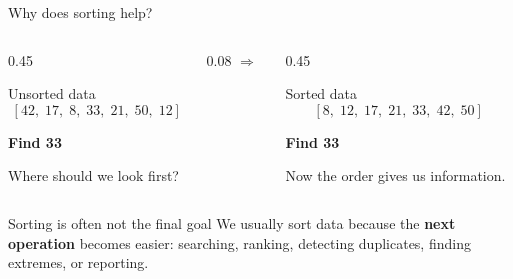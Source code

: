 \documentclass[aspectratio=169]{beamer}
\begin{document}
\begin{frame}{Why does sorting help?}
\small

\begin{columns}[T,onlytextwidth]

\begin{column}{0.45\textwidth}

\begin{block}{Unsorted data}
\[
[42,\;17,\;8,\;33,\;21,\;50,\;12]
\]

\vspace{0.4em}

\begin{center}
\textbf{Find 33}

\medskip

Where should we look first?
\end{center}

\end{block}

\end{column}

\begin{column}{0.08\textwidth}
\centering
\vspace{1.6cm}
\Huge$\Longrightarrow$
\end{column}

\begin{column}{0.45\textwidth}

\begin{exampleblock}{Sorted data}
\[
[8,\;12,\;17,\;21,\;33,\;42,\;50]
\]

\vspace{0.4em}

\begin{center}
\textbf{Find 33}

\medskip

Now the order gives us information.
\end{center}

\end{exampleblock}

\end{column}

\end{columns}

\vspace{0.35em}

\begin{alertblock}{Sorting is often not the final goal}
We usually sort data because the \textbf{next operation} becomes easier:
searching, ranking, detecting duplicates, finding extremes, or reporting.
\end{alertblock}

\end{frame}
\end{document}
